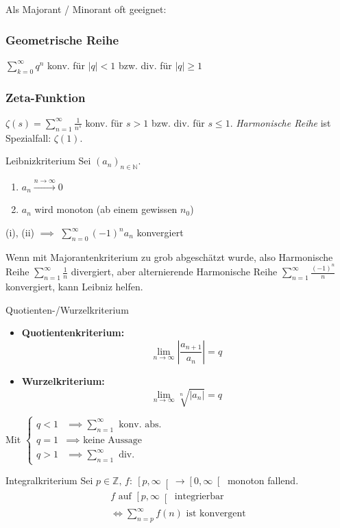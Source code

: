 \documentclass[a4paper,10pt]{article}
\def\limn{\lim_{n\to \infty}}
\def\sumn{\sum_{n=0}^\infty}
\def\N{\mathbb{N}}
\def\Z{\mathbb{Z}}
\begin{document}
Als Majorant / Minorant oft geeignet:
\subsubsection{Geometrische Reihe} 
$\sum_{k=0}^\infty q^n$ konv. für $|q| < 1$ bzw. div. für $|q| \ge 1$
\subsubsection{Zeta-Funktion}
$\zeta(s) = \sum_{n=1}^\infty \frac{1}{n^s}$ konv. für $s > 1$ bzw. div. für $s \le 1$.
\emph{Harmonische Reihe} ist Spezialfall: $\zeta(1)$.

\begin{mainbox}{Leibnizkriterium}
Sei $(a_n)_{n \in \N}$.
\renewcommand{\labelenumi}{(\roman{enumi})}
\begin{enumerate}
    \item $a_n \xrightarrow{n \to \infty} 0$
    \item $a_n$ wird monoton (ab einem gewissen $n_0$)
\end{enumerate}
(i), (ii) $\implies$ $\sumn{(-1)^n a_n}$ konvergiert
\end{mainbox}
Wenn mit Majorantenkriterium zu grob abgeschätzt wurde, also Harmonische Reihe $\sum_{n=1}^\infty \frac{1}{n}$ divergiert, aber alternierende Harmonische Reihe $\sum_{n=1}^\infty \frac{(-1)^n}{n}$ konvergiert, kann Leibniz helfen.

\begin{mainbox}{Quotienten-/Wurzelkriterium}
\begin{itemize}
    \item \textbf{Quotientenkriterium:} \[ \limn{\left| \frac{a_{n+1}}{a_n} \right|} = q \]
    \item \textbf{Wurzelkriterium:} \[ \limn{\sqrt[n]{\left| a_n \right|}} = q \]
\end{itemize}
Mit \(
\begin{cases}
    q < 1 &\implies \sum_{n=1}^\infty \text{ konv. abs.} \\
    q = 1 &\implies \text{ keine Aussage} \\
    q > 1 &\implies \sum_{n=1}^\infty \text{ div.}
\end{cases}
\)
\end{mainbox}

\begin{subbox}{Integralkriterium}
Sei $p \in \Z, \, f: \: \left[ p, \infty \right[ \to \left[ 0, \infty \right[$ monoton fallend.
\begin{multline*}
    f \text{ auf } \left[p, \infty \right[ \text{ integrierbar} \\
    \iff \sum_{n=p}^\infty f(n) \text{ ist konvergent}
\end{multline*}
\end{subbox}
\end{document}
